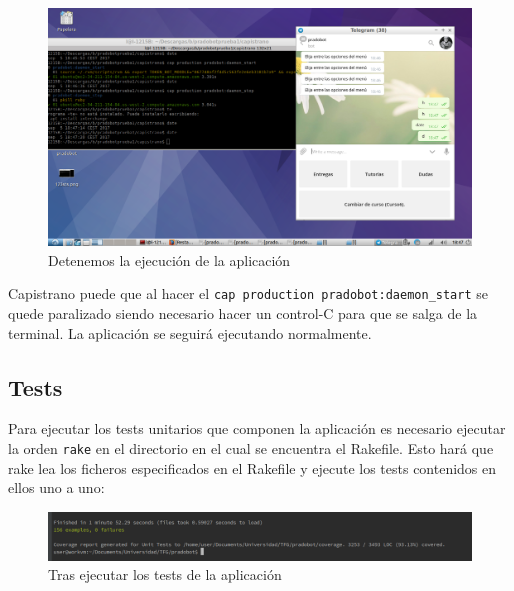 \begin{figure}[H] %
\centering
\includegraphics[scale=0.3]{imagenes/random/2017-09-05-184725_1366x768_scrot.png}  %

\caption{Detenemos la ejecución de la aplicación}\label{figura910}

\end{figure}


Capistrano puede que al hacer el \texttt{cap production pradobot:daemon\_start} se quede paralizado siendo necesario hacer un control-C para que se salga de la terminal. La aplicación se seguirá ejecutando normalmente.


\subsection{Tests}

Para ejecutar los tests unitarios que componen la aplicación es necesario ejecutar la orden \texttt{rake} en el directorio en el cual se encuentra el Rakefile. Esto hará que rake lea los ficheros especificados en el Rakefile y ejecute los tests contenidos en ellos uno a uno:

\begin{figure}[H] %
\centering
\includegraphics[scale=0.4]{imagenes/random/Screenshot_2017-09-04_18-28-17.png}  %

\caption{Tras ejecutar los tests de la aplicación}\label{figura92}

\end{figure}

